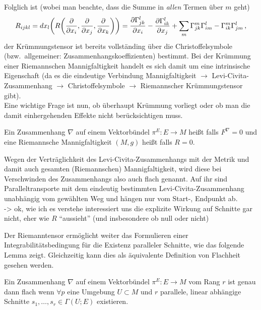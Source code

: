 \documentclass[../H_Analysis_main.tex]{subfiles}
\begin{document}
Folglich ist (wobei man beachte, dass die Summe in \emph{allen} Termen über $m$ geht)
\begin{equation}
R_{ijkl} = dx_l\qty(R\qty(\pdv{x_i}, \pdv{x_j}, \pdv{x_k})) = \pdv{\Gamma_{jk}^l}{x_i} - \pdv{\Gamma_{ik}^l}{x_j} + \sum_m \Gamma_{jk}^m \Gamma_{im}^l - \Gamma_{ik}^m \Gamma_{jm}^l \, ,
\end{equation}
der Krümmungstensor ist bereits vollständing über die Christoffelsymbole (bzw.~allgemeiner: Zusammenhangskoeffizienten) bestimmt. Bei der Krümmung einer Riemannschen Mannigfaltigkeit handelt es sich damit um eine intrinsische Eigenschaft (da es die eindeutige Verbindung Mannigfaltigkeit $\rightarrow$ Levi-Civita-Zusammenhang $\rightarrow$ Christoffelsymbole $\rightarrow$ Riemannscher Krümmungstensor gibt).\\


Eine wichtige Frage ist nun, ob überhaupt Krümmung vorliegt oder ob man die damit einhergehenden Effekte nicht berücksichtigen muss.

\begin{defi}[Flachheit]
Ein Zusammenhang $\nabla$ auf einem Vektorbündel $\pi^E: E \rightarrow M$ heißt  falls $F^\nabla = 0$ und eine Riemannsche Mannigfaltigkeit $(M, g)$ heißt  falls $R = 0$.
\end{defi}

Wegen der Verträglichkeit des Levi-Civita-Zusammenhangs mit der Metrik und damit auch gesamten (Riemannschen) Mannigfaltigkeit, wird diese bei Verschwinden des Zusammenhangs also auch flach genannt. Auf ihr sind Paralleltransporte mit dem eindeutig bestimmten Levi-Civita-Zusammenhang unabhängig vom gewählten Weg und hängen nur vom Start-, Endpunkt ab.\\


-> ok, wie ich es verstehe interessiert uns die explizite Wirkung auf Schnitte gar nicht, eher wie $R$ \enquote{aussieht} (und insbesondere ob null oder nicht)



Der Riemanntensor ermöglicht weiter das Formulieren einer Integrabilitätsbedingung für die Existenz paralleler Schnitte, wie das folgende Lemma zeigt. Gleichzeitig kann dies als äquivalente Definition von Flachheit gesehen werden.
\begin{satz}[Flachheit V2]
Ein Zusammenhang $\nabla$ auf einem Vektorbündel $\pi^E: E \rightarrow M$ vom Rang $r$ ist genau dann flach wenn $\forall p$ eine Umgebung $U \subset M$ und $r$ parallele, linear abhängige Schnitte $s_1, \dots, s_r \in \Gamma(U; E)$ existieren.
\end{satz}
\end{document}
